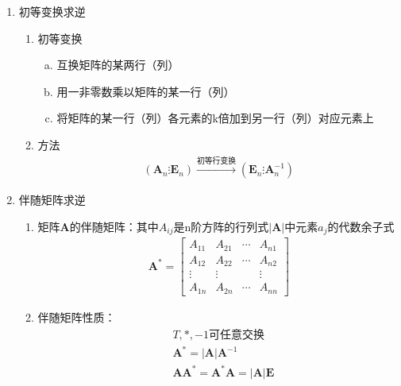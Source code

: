 \documentclass[12pt]{book}
\begin{document}
\begin{enumerate}[1.]
    \item 初等变换求逆
          \begin{enumerate}[(1)]
              \item 初等变换
                    \begin{enumerate}[a.]
                        \item 互换矩阵的某两行（列）
                        \item 用一非零数乘以矩阵的某一行（列）
                        \item 将矩阵的某一行（列）各元素的k倍加到另一行（列）对应元素上
                    \end{enumerate}
              \item 方法
                    \begin{gather*}
                        (\bm{A}_{n}\vdots \bm{E}_{n})\xrightarrow{初等行变换}(\bm{E}_{n}\vdots\bm{A}^{-1}_{n})
                    \end{gather*}
          \end{enumerate}
    \item 伴随矩阵求逆
          \begin{enumerate}[(1)]
              \item 矩阵$\bm{A}$的伴随矩阵：其中$A_{ij}$是n阶方阵的行列式$|\bm{A}|$中元素$a_{j}$的代数余子式
                    \begin{gather*}
                        \bm{A}^* = \begin{bmatrix}
                            A_{11} & A_{21} & \cdots & A_{n1} \\
                            A_{12} & A_{22} & \cdots & A_{n2} \\
                            \vdots & \vdots &        & \vdots \\
                            A_{1n} & A_{2n} & \cdots & A_{nn}
                        \end{bmatrix}
                    \end{gather*}
              \item 伴随矩阵性质：
              \begin{align*}
                         & T,*,-1 \text{可任意交换}                           \\
                         & \bm{A}^{*} = |\bm{A}|\bm{A}^{-1}                   \\
                         & \bm{A}\bm{A}^{*} = \bm{A}^{*}\bm{A}=|\bm{A}|\bm{E} \\

\end{align*}
\end{enumerate}
\end{enumerate}
\end{document}
